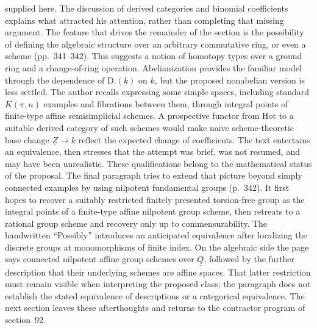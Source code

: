 \documentclass[10pt,oneside]{book}
\begin{document}
supplied here. The discussion of derived categories and binomial coefficients explains what attracted his attention, rather than completing that missing argument. The feature that drives the remainder of the section is the possibility of defining the algebraic structure over an arbitrary commutative ring, or even a scheme (pp.~341--342). This suggests a notion of homotopy types over a ground ring and a change-of-ring operation. Abelianization provides the familiar model through the dependence of $\mathrm{D.}(k)$ on $k$, but the proposed nonabelian version is less settled. The author recalls expressing some simple spaces, including standard $K(\pi,n)$ examples and fibrations between them, through integral points of finite-type affine semisimplicial schemes. A prospective functor from $\mathrm{Hot}$ to a suitable derived category of such schemes would make naive scheme-theoretic base change $\underline Z\to k$ reflect the expected change of coefficients. The text entertains an equivalence, then stresses that the attempt was brief, was not resumed, and may have been unrealistic. These qualifications belong to the mathematical status of the proposal. The final paragraph tries to extend that picture beyond simply connected examples by using nilpotent fundamental groups (p.~342). It first hopes to recover a suitably restricted finitely presented torsion-free group as the integral points of a finite-type affine nilpotent group scheme, then retreats to a rational group scheme and recovery only up to commensurability. The handwritten ``Possibly'' introduces an anticipated equivalence after localizing the discrete groups at monomorphisms of finite index. On the algebraic side the page says connected nilpotent affine group schemes over $\underline Q$, followed by the further description that their underlying schemes are affine spaces. That latter restriction must remain visible when interpreting the proposed class; the paragraph does not establish the stated equivalence of descriptions or a categorical equivalence. The next section leaves these afterthoughts and returns to the contractor program of section~92.
\end{document}
